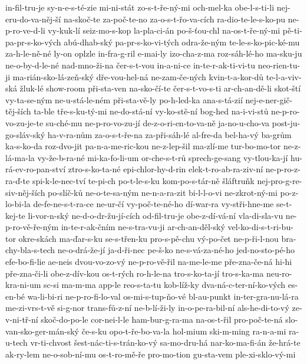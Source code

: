 in-fil-tru-je
sy-n-e-s-té-zie
mi-ni-stát
zo-s-t-ře-ný-mi
och-mel-ka
obe-l-s-ti-li
nej-eru-do-va-něj-ší
na-skoč-te
za-poč-te-no
za-o-s-t-řo-va-cích
ra-dio-te-le-s-ko-pu
ne-p-ro-ve-d-li
vy-kuk-lí
seiz-mo-s-kop
la-pla-ci-án
po-š-ťou-chl
na-os-t-ře-ný-mi
pě-ti-pa-pr-s-ko-vých
abú-dhab-ský
pa-pr-s-ko-vi-tých
odra-že-ným
te-le-s-ko-pic-ké-mu
za-h-le-ně-né
ly-on
oplzle
in-fra-g-ril
e-mai-ly
izo-cha-z-ma
roz-sáh-lé-ho
ma-sku-ju
ne-o-by-d-le-né
nad-mno-ži-na
čer-s-t-vou
in-a-ni-ce
in-te-r-ak-ti-vi-tu
neo-rien-tu-ji
ma-rián-sko-lá-zeň-ský
dře-vou-hel-ná
ne-zam-če-ných
kvin-t-a-kor-dů
te-l-a-viv-ská
žluk-lé
show-room
při-sta-ven
na-sko-čí-te
čer-s-t-vo-s-ti
ar-ch-an-dě-li
skot-ští
vy-ta-se-ným
ne-u-stá-le-ném
při-sta-vě-ly
po-h-led-ka
ana-s-tá-zií
nej-e-ner-gič-těj-ších
ta-ble
tře-s-ku-tý-mi
ne-do-stá-ní
vy-ko-stě-ní
bog-hed
na-i-vi-stů
ne-p-ro-vo-zu-je-te
su-ché-mu
ne-p-ro-vo-zu-jí
de-z-o-ri-en-to-va-ně
ja-no-u-cho-va
post-ju-go-sláv-ský
ha-v-ra-nům
za-o-s-t-ře-na
za-při-sáh-lé
al-fre-da
bel-ha-vý
ba-grům
ka-s-ko-da
roz-dvo-jit
pa-n-a-me-ric-kou
ne-z-lep-šil
ma-zlí-me
tur-bo-mo-tor
ne-z-lá-ma-la
vy-že-b-ra-né
mi-ka-fo-li-um
or-che-s-t-rů
sprech-ge-sang
vy-tlou-ka-jí
hu-rá-ev-ro-pan-ství
ztro-s-ko-ta-né
epi-chlor-hy-d-rin
elek-t-ro-ab-ra-ziv-ní
ne-p-ro-z-ra-ď-te
spi-k-le-nec-tví
te-pi-ch
po-t-le-s-ku
kom-po-s-tár-ně
šláftruňk
nej-pro-g-re-siv-něj-ších
po-slíč-ků
ne-o-te-sa-ným
ne-n-a-ra-zit
bi-l-l-o-vi
ne-zkrot-ný-mi
po-z-lo-bi-la
de-fe-ne-s-t-ra-ce
ne-ur-čí
vy-poč-te-né-ho
dí-war-ra
vy-stři-hne-me
se-t-kej-te
li-vor-n-ský
ne-d-o-dr-žu-jí-cích
od-fil-tru-je
obe-z-dí-vá-ní
vla-di-sla-vu
ne-p-ro-vě-ře-ným
in-te-r-ak-čním
ne-s-tra-vu-ji
ar-ch-an-děl-ský
vel-ko-di-s-t-ri-bu-tor
okre-skách
ma-ďar-s-ku
se-s-třen-ku
pro-s-pě-chu
vý-po-čet
ne-p-ři-l-nou
bra-chy-bla-s-tech
ne-o-drá-že-jí
ja-d-ři-nec
pe-š-ko
ne-s-vá-za-né-ho
jed-no-sto-pé-ho
efe-bo-fi-lie
ae-neis
dvou-vo-zo-vý
ne-p-ro-vě-řil
na-me-le-me
pře-zna-če-ná
hi-hi
pře-zna-či-li
obe-z-dív-kou
os-t-rých
ro-h-le-na
tro-s-ko-ta-jí
tro-s-ka-ma
neu-ro-kra-ni-um
sc-si
ma-m-ma
app-le
reo-s-ta-tu
kob-líž-ky
dva-ná-c-ter-ní-ko-vých
es-en-bé
wa-li-bi-ri
ne-p-ro-fi-lo-val
os-mi-s-tup-ňo-vé
bl-au-punkt
in-ter-gra-nu-lá-ra
me-zi-vrs-t-vě
si-g-nor
trans-fů-z-ní
ne-b-lí-ži-ly
in-o-pe-ra-bil-ní
als-he-di-to-vý
ze-v-ni-tř-ní
skoč-do-po-le
cor-nei-l-le
ham-bur-g-ra-ma
na-os-t-řil
pro-poč-te-ná
slo-van-sko-ger-mán-ský
če-s-ku
opo-t-ře-bo-va-la
hol-mium
ski-m-ming
ra-n-a-mi
ra-u-tech
vr-ti-chvost
šest-nác-ti-s-trán-ko-vý
sa-mo-dru-há
nar-ko-ma-fi-án
že-hrá-te
ak-ry-lem
ne-o-sob-ní-mu
os-t-ro-mě-ře
pro-mo-tion
gu-sta-vem
ple-xi-sklo-vý-mi

